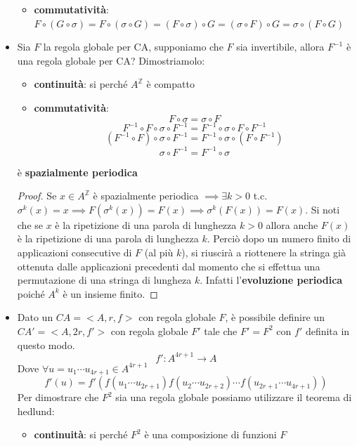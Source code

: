 \begin{itemize}
\begin{itemize}
              \item \textbf{commutatività}: $F\circ (G\circ \sigma) = F\circ (\sigma\circ G) = (F\circ \sigma)\circ G =(\sigma\circ F)\circ G = \sigma\circ (F\circ G)$
          \end{itemize}
    \item Sia $F$ la regola globale per CA, supponiamo che $F$ sia invertibile,
          allora $F^{-1}$ è una regola globale per CA? Dimostriamolo:
          \begin{itemize}
              \item \textbf{continuità}: si perché $A^\mathbb{Z}$ è compatto
              \item \textbf{commutatività}: $$F\circ \sigma = \sigma \circ F $$
                    $$ F^{-1} \circ F\circ \sigma \circ F^{-1}= F^{-1}\circ \sigma \circ F \circ F^{-1}$$
                    $$ (F^{-1} \circ F)\circ \sigma \circ F^{-1}= F^{-1}\circ \sigma \circ (F \circ F^{-1})$$
                    $$ \sigma \circ F^{-1}= F^{-1}\circ \sigma$$
          \end{itemize}
          è  \textbf{spazialmente periodica}
          \begin{proof}
              Se $x\in A^\mathbb{Z}$  è spazialmente periodica $\implies\exists k>0$ t.c.
              $\sigma^k(x)=x \implies F(\sigma^k(x)) = F(x)\implies \sigma^k(F(x))=F(x)$.
              Si noti che se $x$ è la ripetizione di una parola di lunghezza $k>0$ allora
              anche $F(x)$ è la ripetizione di una parola di lunghezza $k$. Perciò dopo
              un numero finito di applicazioni consecutive di $F$ (al più $k$), si riuscirà
              a riottenere la stringa già ottenuta dalle applicazioni precedenti dal momento
              che si effettua una permutazione di una stringa di lungheza $k$. Infatti l'\textbf{evoluzione
                  periodica} poiché $A^k$ è un insieme finito.
          \end{proof}
    \item Dato un $CA = <A,r,f>$ con regola globale $F$, è possibile definire un  $CA '= <A,2r,f'>$
          con regola globale $F'$ tale che $F'=F^2$ con $f'$ definita in questo modo.
          $$f':A^{4r+1}\rightarrow A$$
          Dove $\forall u=u_1\cdots u_{4r+1}\in A^{4r+1}$
          $$f'(u) = f'(f(u_1\cdots u_{2r+1})f(u_{2}\cdots u_{2r+2})\cdots f(u_{2r+1}\cdots u_{4r+1}))$$
          Per dimostrare che $F^2$ sia una regola globale possiamo utilizzare il teorema di
          hedlund:
          \begin{itemize}
              \item \textbf{continuità}: si perché $F^2$ è una composizione di funzioni $F$ 

\end{itemize}
\end{itemize}
